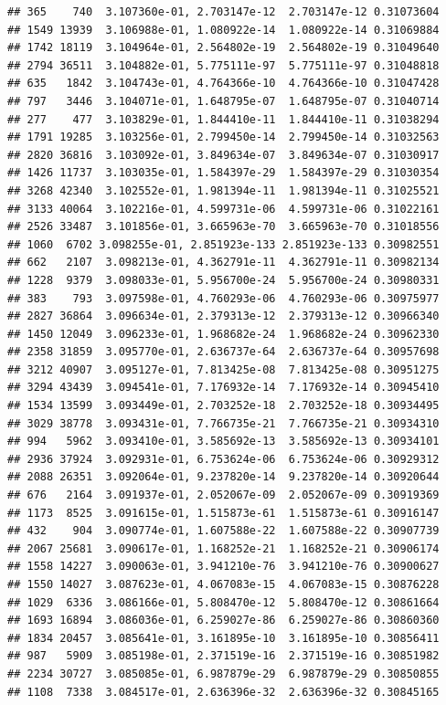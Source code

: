 \documentclass[
]{article}
\begin{document}
\begin{verbatim}
## 365    740  3.107360e-01, 2.703147e-12  2.703147e-12 0.31073604
## 1549 13939  3.106988e-01, 1.080922e-14  1.080922e-14 0.31069884
## 1742 18119  3.104964e-01, 2.564802e-19  2.564802e-19 0.31049640
## 2794 36511  3.104882e-01, 5.775111e-97  5.775111e-97 0.31048818
## 635   1842  3.104743e-01, 4.764366e-10  4.764366e-10 0.31047428
## 797   3446  3.104071e-01, 1.648795e-07  1.648795e-07 0.31040714
## 277    477  3.103829e-01, 1.844410e-11  1.844410e-11 0.31038294
## 1791 19285  3.103256e-01, 2.799450e-14  2.799450e-14 0.31032563
## 2820 36816  3.103092e-01, 3.849634e-07  3.849634e-07 0.31030917
## 1426 11737  3.103035e-01, 1.584397e-29  1.584397e-29 0.31030354
## 3268 42340  3.102552e-01, 1.981394e-11  1.981394e-11 0.31025521
## 3133 40064  3.102216e-01, 4.599731e-06  4.599731e-06 0.31022161
## 2526 33487  3.101856e-01, 3.665963e-70  3.665963e-70 0.31018556
## 1060  6702 3.098255e-01, 2.851923e-133 2.851923e-133 0.30982551
## 662   2107  3.098213e-01, 4.362791e-11  4.362791e-11 0.30982134
## 1228  9379  3.098033e-01, 5.956700e-24  5.956700e-24 0.30980331
## 383    793  3.097598e-01, 4.760293e-06  4.760293e-06 0.30975977
## 2827 36864  3.096634e-01, 2.379313e-12  2.379313e-12 0.30966340
## 1450 12049  3.096233e-01, 1.968682e-24  1.968682e-24 0.30962330
## 2358 31859  3.095770e-01, 2.636737e-64  2.636737e-64 0.30957698
## 3212 40907  3.095127e-01, 7.813425e-08  7.813425e-08 0.30951275
## 3294 43439  3.094541e-01, 7.176932e-14  7.176932e-14 0.30945410
## 1534 13599  3.093449e-01, 2.703252e-18  2.703252e-18 0.30934495
## 3029 38778  3.093431e-01, 7.766735e-21  7.766735e-21 0.30934310
## 994   5962  3.093410e-01, 3.585692e-13  3.585692e-13 0.30934101
## 2936 37924  3.092931e-01, 6.753624e-06  6.753624e-06 0.30929312
## 2088 26351  3.092064e-01, 9.237820e-14  9.237820e-14 0.30920644
## 676   2164  3.091937e-01, 2.052067e-09  2.052067e-09 0.30919369
## 1173  8525  3.091615e-01, 1.515873e-61  1.515873e-61 0.30916147
## 432    904  3.090774e-01, 1.607588e-22  1.607588e-22 0.30907739
## 2067 25681  3.090617e-01, 1.168252e-21  1.168252e-21 0.30906174
## 1558 14227  3.090063e-01, 3.941210e-76  3.941210e-76 0.30900627
## 1550 14027  3.087623e-01, 4.067083e-15  4.067083e-15 0.30876228
## 1029  6336  3.086166e-01, 5.808470e-12  5.808470e-12 0.30861664
## 1693 16894  3.086036e-01, 6.259027e-86  6.259027e-86 0.30860360
## 1834 20457  3.085641e-01, 3.161895e-10  3.161895e-10 0.30856411
## 987   5909  3.085198e-01, 2.371519e-16  2.371519e-16 0.30851982
## 2234 30727  3.085085e-01, 6.987879e-29  6.987879e-29 0.30850855
## 1108  7338  3.084517e-01, 2.636396e-32  2.636396e-32 0.30845165

\end{verbatim}
\end{document}
